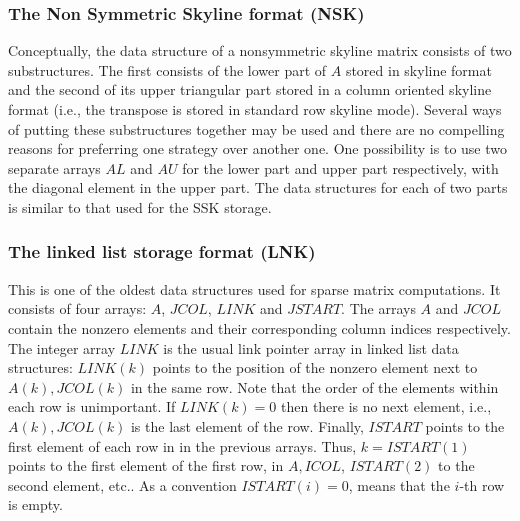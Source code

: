 \subsubsection{The Non Symmetric Skyline format (NSK) }
Conceptually, the  data structure of a nonsymmetric skyline 
matrix consists of two substructures. 
The first consists of the lower part of $A$ stored in skyline format
and the second of its upper triangular part stored in a column
oriented skyline format (i.e., the transpose is stored in
standard row skyline mode). Several ways of putting these
substructures together may be used and there are no compelling 
reasons for preferring one strategy over another one. 
One possibility is to use two separate arrays $AL$ and $AU$ for
the lower part and upper part respectively, with the diagonal 
element in the upper part. The data structures for each of 
two parts is similar to that used for the SSK storage.


\subsubsection{The linked list storage format (LNK) }  
This is one of the oldest data structures used for sparse matrix computations.
It consists of four arrays: $A$, $JCOL$, $LINK$ and $JSTART$. 
The arrays $A$ and $JCOL$ contain the nonzero elements and their
corresponding column indices respectively. The integer array $LINK$ is
the usual link pointer array in linked list data structures: 
$LINK(k)$ points to the position of the nonzero element next to 
$A(k), JCOL(k)$ in the same row. Note that the order of the elements 
within each row is unimportant.  If $LINK(k) =0$ then there is no
next element, i.e., $A(k), JCOL(k)$ is the last element of the row.
Finally, $ISTART$ points to the first element of each row in 
in the previous arrays. Thus, $k=ISTART(1)$ points to the first element
of the first row, in $A, ICOL$, 
 $ISTART(2) $ to the second element, etc..
As a convention $ISTART(i) = 0$, means that the $i$-th row is empty.

